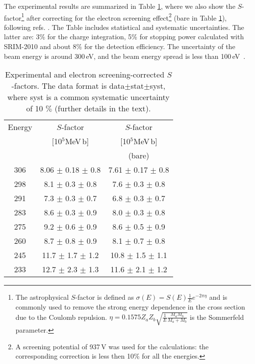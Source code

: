 \documentclass[%
reprint,
groupedaddress,
showpacs,
nofootinbib,
amsmath,amssymb,
aps,
prl,
superscriptaddress,
notitlepage,
floatfix
]{revtex4-2}
\begin{document}
The experimental results are summarized in Table \ref{tab:results}, where we also show the $S$-factor\footnote{The astrophysical $S$-factor is defined as $\sigma(E)=S(E)\frac{1}{E}e^{-2\pi\eta}$ and is commonly used to remove the strong energy dependence in the cross section due to the Coulomb repulsion. $\eta = 0.1575Z_aZ_b\sqrt{\frac{1}{E}\frac{M_aM_b}{M_a+M_b}}$ is the Sommerfeld parameter.} after correcting for the electron screening effect\footnote{A screening potential of 937\,V was used for the calculations: the corresponding correction is less then 10\% for all the energies.} (bare in Table \ref{tab:results}), following refs. \cite{Strieder:2012, Bracci:1990, Huang:1976}. The Table includes statistical and systematic uncertainties. The latter are: 3\% for the charge integration, 5\% for stopping power calculated with SRIM-2010 \cite{Ziegler:2010} and about 8\% for the detection efficiency. The uncertainty of the beam energy is around 300\,eV, and the beam energy spread is less than 100\,eV\ \cite{Formicola:2003}.

\begin{table}[tb]
    \caption{Experimental and electron screening-corrected $S$-factors. The data format is data$\pm$stat$\pm$syst, where syst is a common systematic uncertainty of 10 $\%$ (further details in the text).}
\begin{ruledtabular}
\begin{tabular}{ccc}
    Energy    & $S$-factor          &  $S$-factor      \\\relax
      [keV]       & [10$^5$MeV\,b]     & [10$^5$MeV\,b]  \\
                & &             (bare)    \\
\hline
306 &  8.06 $\pm$ 0.18 $\pm$ 0.8 & 7.61 $\pm$ 0.17 $\pm$ 0.8  \\
298 &  8.1  $\pm$ 0.3 $\pm$ 0.8  & 7.6  $\pm$ 0.3 $\pm$ 0.8 \\
291 &  7.3  $\pm$ 0.3 $\pm$ 0.7 & 6.8  $\pm$ 0.3 $\pm$ 0.7 \\
283 &  8.6  $\pm$ 0.3 $\pm$ 0.9 & 8.0  $\pm$ 0.3 $\pm$ 0.8 \\
275 &  9.2  $\pm$ 0.6 $\pm$ 0.9 & 8.6  $\pm$ 0.5 $\pm$ 0.9 \\
260 &  8.7  $\pm$ 0.8 $\pm$ 0.9 & 8.1  $\pm$ 0.7 $\pm$ 0.8 \\
245 &  11.7 $\pm$ 1.7 $\pm$ 1.2 & 10.8 $\pm$ 1.5 $\pm$ 1.1\\
233 &  12.7  $\pm$ 2.3 $\pm$ 1.3 & 11.6  $\pm$ 2.1 $\pm$ 1.2\\
\end{tabular}
\end{ruledtabular}
\label{tab:results}
\end{table}
\end{document}
